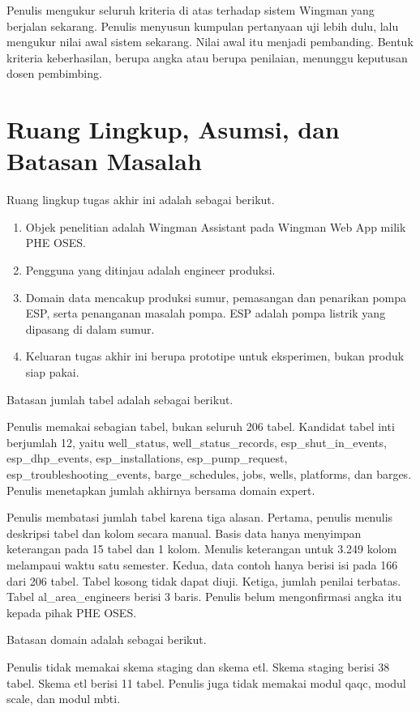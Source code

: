 Penulis mengukur seluruh kriteria di atas terhadap sistem Wingman yang berjalan sekarang. Penulis menyusun kumpulan pertanyaan uji lebih dulu, lalu mengukur nilai awal sistem sekarang. Nilai awal itu menjadi pembanding. Bentuk kriteria keberhasilan, berupa angka atau berupa penilaian, menunggu keputusan dosen pembimbing.

\section{Ruang Lingkup, Asumsi, dan Batasan Masalah}
Ruang lingkup tugas akhir ini adalah sebagai berikut.
\begin{enumerate}
\item	Objek penelitian adalah Wingman Assistant pada Wingman Web App milik PHE OSES.
\item	Pengguna yang ditinjau adalah engineer produksi.
\item	Domain data mencakup produksi sumur, pemasangan dan penarikan pompa ESP, serta penanganan masalah pompa. ESP adalah pompa listrik yang dipasang di dalam sumur.
\item	Keluaran tugas akhir ini berupa prototipe untuk eksperimen, bukan produk siap pakai.
\end{enumerate}

Batasan jumlah tabel adalah sebagai berikut.

Penulis memakai sebagian tabel, bukan seluruh 206 tabel. Kandidat tabel inti berjumlah 12, yaitu well\_status, well\_status\_records, esp\_shut\_in\_events, esp\_dhp\_events, esp\_installations, esp\_pump\_request, esp\_troubleshooting\_events, barge\_schedules, jobs, wells, platforms, dan barges. Penulis menetapkan jumlah akhirnya bersama domain expert.

Penulis membatasi jumlah tabel karena tiga alasan. Pertama, penulis menulis deskripsi tabel dan kolom secara manual. Basis data hanya menyimpan keterangan pada 15 tabel dan 1 kolom. Menulis keterangan untuk 3.249 kolom melampaui waktu satu semester. Kedua, data contoh hanya berisi isi pada 166 dari 206 tabel. Tabel kosong tidak dapat diuji. Ketiga, jumlah penilai terbatas. Tabel al\_area\_engineers berisi 3 baris. Penulis belum mengonfirmasi angka itu kepada pihak PHE OSES.

Batasan domain adalah sebagai berikut.

Penulis tidak memakai skema staging dan skema etl. Skema staging berisi 38 tabel. Skema etl berisi 11 tabel. Penulis juga tidak memakai modul qaqc, modul scale, dan modul mbti.

